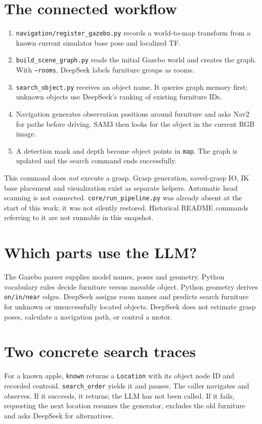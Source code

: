 \documentclass[11pt,a4paper]{book}
\begin{document}
\section{The connected workflow}
\begin{enumerate}
\item \texttt{navigation/register\_gazebo.py} records a world-to-map transform
from a known current simulator base pose and localized TF.
\item \texttt{build\_scene\_graph.py} reads the initial Gazebo world and
creates the graph. With \texttt{--rooms}, DeepSeek labels furniture groups as rooms.
\item \texttt{search\_object.py} receives an object name. It queries graph
memory first; unknown objects use DeepSeek's ranking of existing furniture IDs.
\item Navigation generates observation positions around furniture and asks Nav2
for paths before driving. SAM3 then looks for the object in the current RGB image.
\item A detection mask and depth become object points in \texttt{map}.
The graph is updated and the search command ends successfully.
\end{enumerate}

This command does \emph{not} execute a grasp. Grasp generation, saved-grasp IO,
IK base placement and visualization exist as separate helpers. Automatic head
scanning is not connected. \texttt{core/run\_pipeline.py} was already absent at
the start of this work; it was not silently restored. Historical README commands
referring to it are not runnable in this snapshot.

\section{Which parts use the LLM?}
The Gazebo parser supplies model names, poses and geometry. Python vocabulary
rules decide furniture versus movable object. Python geometry derives
\texttt{on/in/near} edges. DeepSeek assigns room names and predicts search
furniture for unknown or unsuccessfully located objects. DeepSeek does not
estimate grasp poses, calculate a navigation path, or control a motor.

\section{Two concrete search traces}
For a known apple, \texttt{known} returns a \texttt{Location} with its object
node ID and recorded centroid. \texttt{search\_order} yields it and pauses.
The caller navigates and observes. If it succeeds, it returns; the LLM has not
been called. If it fails, requesting the next location resumes the generator,
excludes the old furniture and asks DeepSeek for alternatives.
\end{document}
